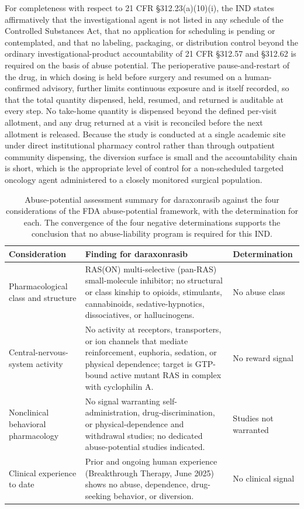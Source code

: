 For completeness with respect to 21 CFR \S 312.23(a)(10)(i), the IND states
affirmatively that the investigational agent is not listed in any schedule of the
Controlled Substances Act, that no application for scheduling is pending or
contemplated, and that no labeling, packaging, or distribution control beyond the
ordinary investigational-product accountability of 21 CFR \S 312.57 and \S 312.62 is
required on the basis of abuse potential. The perioperative pause-and-restart of the
drug, in which dosing is held before surgery and resumed on a human-confirmed
advisory, further limits continuous exposure and is itself recorded, so that the
total quantity dispensed, held, resumed, and returned is auditable at every step. No
take-home quantity is dispensed beyond the defined per-visit allotment, and any drug
returned at a visit is reconciled before the next allotment is released. Because the
study is conducted at a single academic site under direct institutional pharmacy
control rather than through outpatient community dispensing, the diversion surface is
small and the accountability chain is short, which is the appropriate level of
control for a non-scheduled targeted oncology agent administered to a closely
monitored surgical population.

\begin{table}[htbp]
\centering
\footnotesize
\caption{Abuse-potential assessment summary for daraxonrasib against the four
considerations of the FDA abuse-potential framework, with the determination for
each. The convergence of the four negative determinations supports the conclusion
that no abuse-liability program is required for this IND.}
\label{tab:abuse-potential}
\begin{tabularx}{\textwidth}{L{4.2cm} Y L{2.6cm}}
\toprule
\textbf{Consideration} & \textbf{Finding for daraxonrasib} & \textbf{Determination} \\
\midrule
Pharmacological class and structure & RAS(ON) multi-selective (pan-RAS) small-molecule inhibitor; no structural or class kinship to opioids, stimulants, cannabinoids, sedative-hypnotics, dissociatives, or hallucinogens. & No abuse class \\
Central-nervous-system activity & No activity at receptors, transporters, or ion channels that mediate reinforcement, euphoria, sedation, or physical dependence; target is GTP-bound active mutant RAS in complex with cyclophilin A. & No reward signal \\
Nonclinical behavioral pharmacology & No signal warranting self-administration, drug-discrimination, or physical-dependence and withdrawal studies; no dedicated abuse-potential studies indicated. & Studies not warranted \\
Clinical experience to date & Prior and ongoing human experience (Breakthrough Therapy, June 2025) shows no abuse, dependence, drug-seeking behavior, or diversion. & No clinical signal \\
\bottomrule
\end{tabularx}
\end{table}

